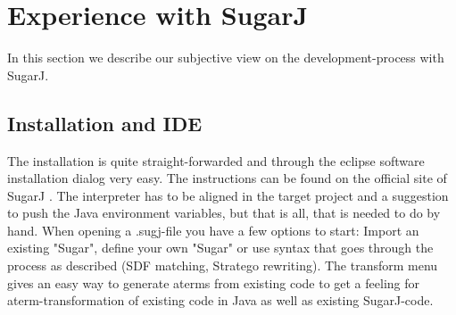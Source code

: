\documentclass{report}
\begin{document}
\section{Experience with SugarJ}
In this section we describe our subjective view on the development-process with SugarJ.

\subsection{Installation and IDE}
The installation is quite straight-forwarded and through the eclipse software installation dialog very easy. The instructions can be found on the official site of SugarJ \cite{SugarJ-Homepage}. The interpreter has to be aligned in the target project and a suggestion to push the Java environment variables, but that is all, that is needed to do by hand. When opening a .sugj-file you have a few options to start: Import an existing "Sugar", define your own "Sugar" or use syntax that goes through the process as described (SDF matching, Stratego rewriting). The transform menu gives an easy way to generate aterms from existing code to get a feeling for aterm-transformation of existing code in Java as well as existing SugarJ-code.
\end{document}
